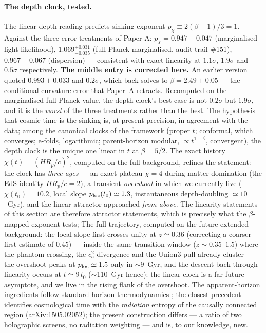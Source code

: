 \documentclass[11pt]{article}
\begin{document}
\paragraph{The depth clock, tested.} The linear-depth reading predicts sinking exponent $p_\chi \equiv 2(\beta-1)/3 = 1$. Against the three error treatments of Paper A: $p_\chi = 0.947 \pm 0.047$ (marginalised light likelihood), $1.069^{+0.031}_{-0.035}$ (full-Planck marginalised, audit trail \#151), $0.967 \pm 0.067$ (dispersion) --- consistent with exact linearity at $1.1\sigma$, $1.9\sigma$ and $0.5\sigma$ respectively. \textbf{The middle entry is corrected here.} An earlier version quoted $0.993 \pm 0.033$ and $0.2\sigma$, which back-solves to $\beta = 2.49 \pm 0.05$ --- the conditional curvature error that Paper~A retracts. Recomputed on the marginalised full-Planck value, the depth clock's best case is not $0.2\sigma$ but $1.9\sigma$, and it is the \emph{worst} of the three treatments rather than the best. The hypothesis that cosmic time is the sinking is, at present precision, in agreement with the data; among the canonical clocks of the framework (proper $t$; conformal, which converges; e-folds, logarithmic; parent-horizon modular, $\propto t^{1-\beta}$, convergent), the depth clock is the unique one linear in $t$ at $\beta = 5/2$. The exact history $\chi(t) = (HR_p/c)^2$, computed on the full background, refines the statement: the clock has \emph{three ages} --- an exact plateau $\chi = 4$ during matter domination (the EdS identity $HR_p/c = 2$), a transient \emph{overshoot} in which we currently live ($\chi(t_0) = 10.2$, local slope $p_{\rm loc}(t_0) \simeq 1.3$, instantaneous depth-doubling $\simeq 10$~Gyr), and the linear attractor approached \emph{from above}. The linearity statements of this section are therefore attractor statements, which is precisely what the $\beta$-mapped exponent tests; The full trajectory, computed on the future-extended background: the local slope first crosses unity at $z \simeq 0.36$ (correcting a coarser first estimate of $0.45$) --- inside the same transition window ($z \sim 0.35$--$1.5$) where the phantom crossing, the $c_a^2$ divergence and the Union3 pull already cluster --- the overshoot peaks at $p_{\rm loc} \simeq 1.5$ only in $\sim$9~Gyr, and the descent back through linearity occurs at $t \simeq 9\,t_0$ ($\sim$110~Gyr hence): the linear clock is a far-future asymptote, and we live in the rising flank of the overshoot. The apparent-horizon ingredients follow standard horizon thermodynamics \cite{Faraoni2011}; the closest precedent identifies cosmological time with the \emph{radiation} entropy of the causally connected region (arXiv:1505.02052); the present construction differs --- a ratio of two holographic screens, no radiation weighting --- and is, to our knowledge, new.
\end{document}
